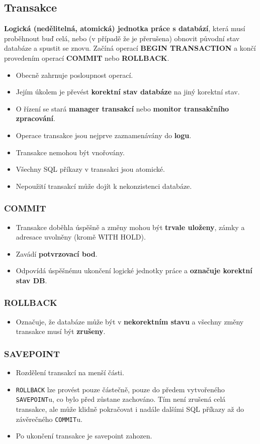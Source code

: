 \subsection{Transakce}
\textbf{Logická (nedělitelná, atomická) jednotka práce s databází}, která musí proběhnout buď celá, nebo (v případě že je přerušena) obnovit původní stav databáze a spustit se znovu. Začíná operací \textbf{BEGIN TRANSACTION} a končí provedením operací \textbf{COMMIT} nebo \textbf{ROLLBACK}.
\begin{itemize}
\item Obecně zahrnuje posloupnost operací.
\item Jejím úkolem je převést \textbf{korektní stav databáze} na jiný korektní stav.
\item O řízení se stará \textbf{manager transakcí} nebo \textbf{monitor transakčního zpracování}.
\item Operace transakce jsou nejprve zaznamenávány do\textbf{ logu}.
\item Transakce nemohou být vnořovány.
\item Všechny SQL příkazy v transakci jsou atomické.
\item Nepoužití transakcí může dojít k nekonzistenci databáze.
\end{itemize}

\subsubsection{COMMIT}
\begin{itemize}
	\item Transakce doběhla úspěšně a změny mohou být \textbf{trvale uloženy}, zámky a adresace uvolněny (kromě WITH HOLD).
	\item Zavádí \textbf{potvrzovací bod}.
	\item Odpovídá úspěšnému ukončení logické jednotky práce a \textbf{označuje korektní stav DB}.
\end{itemize}
\subsubsection{ROLLBACK}
\begin{itemize}
	\item Označuje, že databáze může být v \textbf{nekorektním stavu} a všechny změny transakce musí být \textbf{zrušeny}.
\end{itemize}

\subsubsection{SAVEPOINT}
\begin{itemize}
	\item Rozdělení transakcí na menší části.
	\item \texttt{ROLLBACK} lze provést pouze částečně, pouze do předem vytvořeného \texttt{SAVEPOINT}u, co bylo před zůstane zachováno. Tím není zrušená celá transakce, ale může klidně pokračovat i nadále dalšími SQL příkazy až do závěrečného \texttt{COMMIT}u.
	\item Po ukončení transakce je savepoint zahozen.
\end{itemize}


